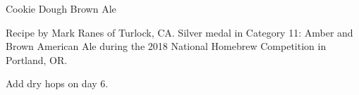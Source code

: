 \begin{recipe}{Cookie Dough Brown Ale} %

\begin{aboutblock}
Recipe by Mark Ranes of Turlock, CA. Silver medal in Category 11: Amber and Brown
American Ale during the 2018 National Homebrew Competition in Portland, OR.
\sourceaha
\end{aboutblock}


\begin{methodandtiming}

\begin{mashsteps}
\end{mashsteps}

\begin{fermentationsteps}
\end{fermentationsteps}

\begin{directions}
Add dry hops on day 6.
\end{directions}

\end{methodandtiming}

\recipebreak

\begin{ingredientsblock}

\begin{malts}
\end{malts}

\begin{hops}
\end{hops}


\end{ingredientsblock}

\end{recipe}

